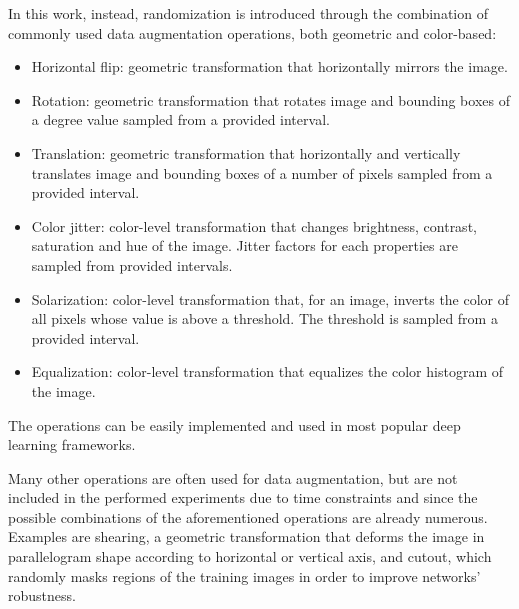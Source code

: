 \documentclass[%
    corpo=12pt,
    twoside,
    stile=classica,   
    tipotesi=magistrale,
    evenboxes,
    english
]{toptesi}
\begin{document}
In this work, instead, randomization is introduced through the combination of commonly used data augmentation operations, both geometric and color-based:
\begin{itemize}
	\item Horizontal flip: geometric transformation that horizontally mirrors the image.
	\item Rotation: geometric transformation that rotates image and bounding boxes of a degree value sampled from a provided interval.
	\item Translation: geometric transformation that horizontally and vertically translates image and bounding boxes of a number of pixels sampled from a provided interval.
	\item Color jitter: color-level transformation that changes brightness, contrast, saturation and hue of the image. Jitter factors for each properties are sampled from provided intervals.
	\item Solarization: color-level transformation that, for an image, inverts the color of all pixels whose value is above a threshold. The threshold is sampled from a provided interval.
	\item Equalization: color-level transformation that equalizes the color histogram of the image.
\end{itemize}
The operations can be easily implemented and used in most popular deep learning frameworks.

Many other operations are often used for data augmentation, but are not included in the performed experiments due to time constraints and since the possible combinations of the aforementioned operations are already numerous. Examples are shearing, a geometric transformation that deforms the image in parallelogram shape according to horizontal or vertical axis,
and cutout, which randomly masks regions of the training images in order to improve networks' robustness.
\end{document}
